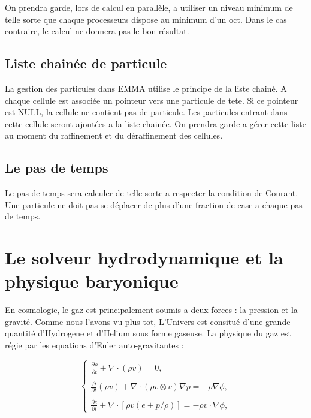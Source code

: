 On prendra garde, lors de calcul en parallèle, a utiliser un niveau minimum de telle sorte que chaque processeurs dispose au minimum d'un oct.
Dans le cas contraire, le calcul ne donnera pas le bon résultat.

\subsection{Liste chainée de particule}
La gestion des particules dans EMMA utilise le principe de la liste chainé.
A chaque cellule est associée  un pointeur vers une particule de tete.
Si ce pointeur est NULL, la cellule ne contient pas de particule.
Les particules entrant dans cette cellule seront ajoutées a la liste chainée.
On prendra garde a gérer cette liste au moment du raffinement et du déraffinement des cellules.



\subsection{Le pas de temps}

Le pas de temps sera calculer de telle sorte a respecter la condition de Courant.
Une particule ne doit pas se déplacer de plus d'une fraction de case a chaque pas de temps.




\section{Le solveur hydrodynamique et la physique baryonique}



En cosmologie, le gaz est principalement soumis a deux forces : la pression et la gravité.
Comme nous l'avons vu plus tot, L'Univers est consitué d'une grande quantité d'Hydrogene et d'Helium sous forme gaseuse.
La physique du gaz est régie par les equations d'Euler auto-gravitantes :

\begin{equation}
\begin{cases}

{ \frac{ \partial \rho }{ \partial t } + \nabla \cdot (\rho v) = 0}, \\
\\
{ \frac{ \partial }{ \partial t } (\rho v) + \nabla \cdot (\rho v \otimes v ) \nabla p = -\rho\nabla \phi }, \\
\\
{ \frac{ \partial e }{ \partial t } + \nabla \cdot [ \rho v (e+p/\rho) ] = -\rho v \cdot \nabla \phi },

\end{cases}
\end{equation}
\label{eq:hydro}

